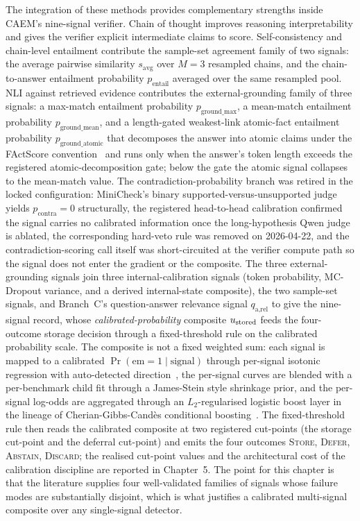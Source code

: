 The integration of these methods provides complementary strengths inside CAEM's nine-signal verifier. Chain of thought improves reasoning interpretability and gives the verifier explicit intermediate claims to score. Self-consistency and chain-level entailment contribute the sample-set agreement family of two signals: the average pairwise similarity $s_{\text{avg}}$ over $M{=}3$ resampled chains, and the chain-to-answer entailment probability $p_{\text{entail}}$ averaged over the same resampled pool. NLI against retrieved evidence contributes the external-grounding family of three signals: a max-match entailment probability $p_{\text{ground\_max}}$, a mean-match entailment probability $p_{\text{ground\_mean}}$, and a length-gated weakest-link atomic-fact entailment probability $p_{\text{ground\_atomic}}$ that decomposes the answer into atomic claims under the FActScore convention~\cite{min-etal-2023-factscore} and runs only when the answer's token length exceeds the registered atomic-decomposition gate; below the gate the atomic signal collapses to the mean-match value. The contradiction-probability branch was retired in the locked configuration: MiniCheck's binary supported-versus-unsupported judge yields $p_{\text{contra}} = 0$ structurally, the registered head-to-head calibration confirmed the signal carries no calibrated information once the long-hypothesis Qwen judge is ablated, the corresponding hard-veto rule was removed on 2026-04-22, and the contradiction-scoring call itself was short-circuited at the verifier compute path so the signal does not enter the gradient or the composite. The three external-grounding signals join three internal-calibration signals (token probability, MC-Dropout variance, and a derived internal-state composite), the two sample-set signals, and Branch~C's question-answer relevance signal $q_{\text{a,rel}}$ to give the nine-signal record, whose \emph{calibrated-probability} composite $u_{\text{stored}}$ feeds the four-outcome storage decision through a fixed-threshold rule on the calibrated probability scale. The composite is not a fixed weighted sum: each signal is mapped to a calibrated $\Pr(\text{em}=1\mid\text{signal})$ through per-signal isotonic regression with auto-detected direction~\cite{niculescu2005predicting}, the per-signal curves are blended with a per-benchmark child fit through a James-Stein style shrinkage prior, and the per-signal log-odds are aggregated through an $L_{2}$-regularised logistic boost layer in the lineage of Cherian-Gibbs-Cand\`{e}s conditional boosting~\cite{cherian2024conformal}. The fixed-threshold rule then reads the calibrated composite at two registered cut-points (the storage cut-point and the deferral cut-point) and emits the four outcomes \textsc{Store}, \textsc{Defer}, \textsc{Abstain}, \textsc{Discard}; the realised cut-point values and the architectural cost of the calibration discipline are reported in Chapter~5. The point for this chapter is that the literature supplies four well-validated families of signals whose failure modes are substantially disjoint, which is what justifies a calibrated multi-signal composite over any single-signal detector.

